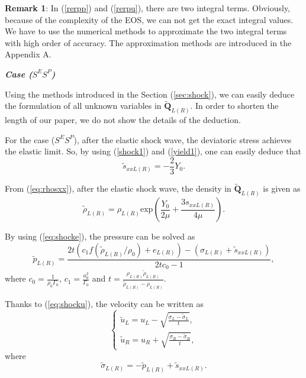 \documentclass{article}
\numberwithin{equation}{section}
\numberwithin{table}{section}
\begin{document}
\textbf{Remark 1}:  In (\ref{rerpp}) and (\ref{rerpu}), there are two integral terms. Obviously, because of the complexity of the EOS, we can not get the exact integral values. We have to use the numerical methods to approximate the two integral terms with high order of accuracy. The approximation methods are introduced in the Appendix A.


\emph{\textbf{Case ($S^{E}S^{P}$)}}

Using the methods introduced in  the Section (\ref{sec:shock}), we can easily deduce the formulation of all unknown variables in $\tilde{\mathbf{Q}}_{L(R)}$. In order to shorten the length of our paper, we do not show the details of the deduction.

For the case ($S^{E}S^{P}$), after the elastic shock wave, the deviatoric stress achieves the elastic limit. So, by using (\ref{shock1}) and (\ref{yield1}), one can easily deduce that
\begin{equation*}
\tilde{s}_{xxL(R)} = -\frac{2}{3}Y_0.
\end{equation*}

From (\ref{eq:rhosxx}), after the elastic shock wave, the density in $\tilde{\mathbf{Q}}_{L(R)}$ is given as
\begin{equation*}
\tilde{\rho}_{L(R)} = \rho_{L(R)} \text{exp}\left(\frac{Y_0}{2\mu}+\frac{3 s_{xxL(R)}}{4\mu}\right).
\end{equation*}


By using (\ref{eq:shocke}), the pressure can be solved as
\begin{equation}
  \tilde{p}_{L(R)}=
  \frac{2t(c_1f(\tilde{\rho}_{L(R)}/\rho_0)+e_{L(R)})-(\sigma_{L(R)}+\tilde{s}_{xxL(R)})}{2tc_0-1},
\end{equation}
where $c_0 = \frac{1}{\rho_0\Gamma_0}$, $c_1 = \frac{a_0^2}{\Gamma_0}$ and $ t=\frac{\rho_{L(R)} \tilde{\rho}_{L(R)}}{\tilde{\rho}_{L(R)}-\rho_{L(R)}}$.

Thanks to (\ref{eq:shocku}), the velocity can be written as
\begin{equation}
 \left\{ \begin{array}{ll}
   \tilde{u}_{L}= u_L -\sqrt{\frac{\sigma_L-\tilde{\sigma}_{L}}{t}},\\
	   \tilde{u}_{R} =   u_R +\sqrt{\frac{\sigma_R-\tilde{\sigma}_{R}}{t}},
   \end{array}
 \right.
 \end{equation}
 where
 \begin{equation}
   \tilde{\sigma}_{L(R)} = -\tilde{p}_{L(R)} + \tilde{s}_{xxL(R)}.
 \end{equation}
\end{document}
